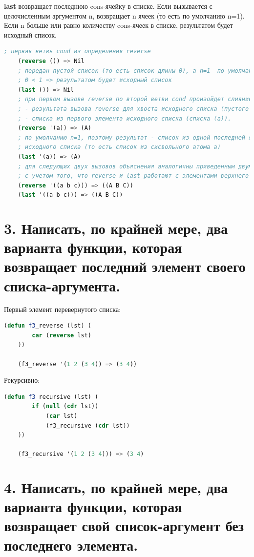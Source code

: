 \documentclass[12pt]{report}
\begin{document}
\textbf{last} возвращает последнюю cons-ячейку в списке. Если вызывается с целочисленным аргументом n, возвращает n ячеек (то есть по умолчанию n=1).
Если n больше или равно количеству cons-ячеек в списке, результатом будет исходный список.


\begin{lstlisting}[language=Lisp]
	; первая ветвь cond из определения reverse
	(reverse ()) => Nil 
	; передан пустой список (то есть список длины 0), а n=1  по умолчанию. 
	; 0 < 1 => результатом будет исходный список
	(last ()) => Nil 
	; при первом вызове reverse по второй ветви cond произойдет слияние: 
	; - результата вызова reverse для хвоста исходного списка (пустого списка);
	; - списка из первого элемента исходного списка (списка (а)).
	(reverse '(a)) => (A)
	; по умолчанию n=1, поэтому результат - список из одной последней ячейки 
	; исходного списка (то есть список из сисвольного атома а)
	(last '(a)) => (A)
	; для следующих двух вызовов объяснения аналогичны приведенным двум выше 
	; с учетом того, что reverse и last работают с элементами верхнего уровня
	(reverse '((a b c))) => ((A B C))
	(last '((a b c))) => ((A B C))
\end{lstlisting}

\clearpage

\section*{3. Написать, по крайней мере, два варианта функции, которая возвращает последний элемент своего списка-аргумента.}


Первый элемент перевернутого списка:
\begin{lstlisting}[language=Lisp]
	(defun f3_reverse (lst) (
		car (reverse lst)
	))
	
	(f3_reverse '(1 2 (3 4)) => (3 4))
\end{lstlisting}

Рекурсивно:
\begin{lstlisting}[language=Lisp]
	(defun f3_recursive (lst) (
		if (null (cdr lst)) 
			(car lst) 	
			(f3_recursive (cdr lst))
	))
	
	(f3_recursive '(1 2 (3 4))) => (3 4)
\end{lstlisting}



\section*{4. Написать, по крайней мере, два варианта функции, которая возвращает свой список-аргумент без последнего элемента.}
\end{document}
